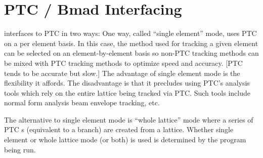 \section{PTC / Bmad Interfacing}
\label{s:ptc.bmad.track}

\bmad interfaces to PTC in two ways: One way, called ``single element'' mode, uses PTC on a per
element basis. In this case, the method used for tracking a given element can be selected on an
element-by-element basis so non-PTC tracking methods can be mixed with PTC tracking methods to
optimize speed and accuracy. [PTC tends to be accurate but slow.] The advantage of single element
mode is the flexibility it affords. The disadvantage is that it precludes using PTC's analysis tools
which rely on the entire lattice being tracked via PTC. Such tools include normal form analysis beam
envelope tracking, etc.

The alternative to single element mode is ``whole lattice'' mode where a series of PTC s
(equivalent to a \bmad branch) are created from a \bmad lattice. Whether single element or whole
lattice mode (or both) is used is determined by the program being run.

